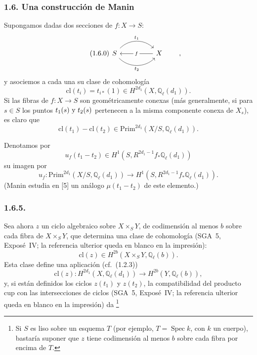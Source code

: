 \subsubsection*{1.6. Una construcción de Manin}

Supongamos dadas dos secciones de $f:X\longrightarrow S$:
\begin{equation}\tag{1.6.0}
\begin{tikzcd}[column sep=huge]
S \arrow[r,bend left=45,"t_1"]
  \arrow[r,bend right=45,"t_2"']
& X \arrow[l,"f" description]
\end{tikzcd}
\qquad ,
\end{equation}
y asociemos a cada una su clase de cohomología
\begin{equation}\tag{1.6.1}
\mathrm{cl}(t_i)=t_{i*}(1)
\in H^{2d_1}(X,\mathbb Q_\ell(d_1)).
\end{equation}
Si las fibras de $f:X\longrightarrow S$ son geométricamente conexas
(más generalmente, si para $s\in S$ los puntos
$\sisi{f(s)\text{ y }g(s)}{t_1(s)\text{ y }t_2(s)}$ pertenecen a la
misma componente conexa de $X_s$), es claro que
\begin{equation}\tag{1.6.2}
\mathrm{cl}(t_1)-\mathrm{cl}(t_2)
\in\mathrm{Prim}^{2d_1}(X/S,\mathbb Q_\ell(d_1)).
\end{equation}

\pageoriginale

Denotamos por
\begin{equation}\tag{1.6.3}
u_f(t_1-t_2)\in H^1(S,R^{2d_1-1}f_*\mathbb Q_\ell(d_1))
\end{equation}
su imagen por
\begin{equation}\tag{1.6.4}
u_f:\mathrm{Prim}^{2d_1}(X/S,\mathbb Q_\ell(d_1))
\longrightarrow H^1(S,R^{2d_1-1}f_*\mathbb Q_\ell(d_1)).
\end{equation}
(Manin estudia en [5] un análogo $\mu(t_1-t_2)$ de este elemento.)

\subsubsection*{1.6.5.}
Sea ahora $z$ un ciclo algebraico sobre $X\times_S Y$, de codimensión al
menos $b$ sobre cada fibra de $X\times_S Y$, que determina una clase de
cohomología (SGA~5, Exposé~IV; la referencia ulterior queda en blanco en
la impresión):
\begin{equation}\tag{1.6.6}
\mathrm{cl}(z)\in H^{2b}(X\times_S Y,\mathbb Q_\ell(b)).
\end{equation}
Esta clase define una aplicación (cf.~(1.2.3))
\begin{equation}\tag{1.6.7}
\mathrm{cl}(z):H^{2d_1}(X,\mathbb Q_\ell(d_1))
\longrightarrow H^{2b}(Y,\mathbb Q_\ell(b)),
\end{equation}
y, si están definidos los ciclos $z(t_1)$ y $z(t_2)$, la compatibilidad
del producto cup con las intersecciones de ciclos (SGA~5, Exposé~IV; la
referencia ulterior queda en blanco en la impresión) da
\footnote{Si $S$ es liso sobre un esquema $T$ (por ejemplo,
$T=\operatorname{Spec}k$, con $k$ un cuerpo), bastaría suponer que $z$
tiene codimensión al menos $b$ sobre cada fibra por encima de $T$.}

